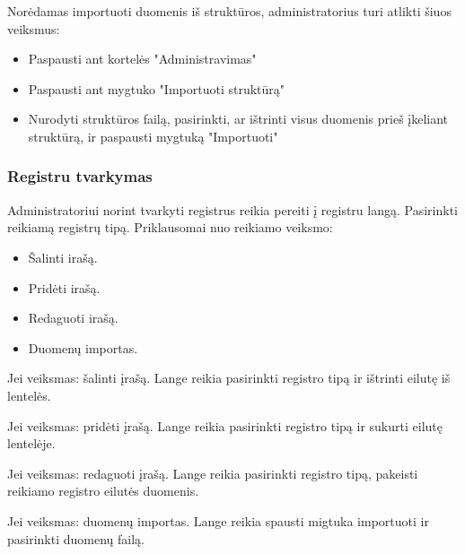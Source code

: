 
	Norėdamas importuoti duomenis iš struktūros, administratorius turi atlikti šiuos veiksmus:
	\begin{itemize}
		\item Paspausti ant kortelės "Administravimas" 
		\item Paspausti ant mygtuko "Importuoti struktūrą" 
		\item Nurodyti struktūros failą, pasirinkti, ar ištrinti visus duomenis prieš įkeliant struktūrą, ir paspausti mygtuką "Importuoti" 
	\end{itemize}

	\subsubsection{Registru tvarkymas}

	Administratoriui norint tvarkyti registrus reikia pereiti į registru langą. Pasirinkti reikiamą registrų tipą. 
	Priklausomai nuo reikiamo veiksmo:
	
	\begin{itemize}
		\item Šalinti irašą.
		\item Pridėti irašą.
		\item Redaguoti irašą.
		\item Duomenų importas.
	\end{itemize}
	
	
	Jei veiksmas: šalinti įrašą. Lange  reikia pasirinkti registro tipą ir ištrinti eilutę iš lentelės.

	Jei veiksmas: pridėti įrašą. Lange  reikia pasirinkti registro tipą ir sukurti eilutę lentelėje.

	Jei veiksmas: redaguoti įrašą. Lange  reikia pasirinkti registro tipą, pakeisti reikiamo registro eilutės duomenis.

	Jei veiksmas: duomenų importas. Lange  reikia spausti migtuka importuoti ir pasirinkti duomenų failą.

